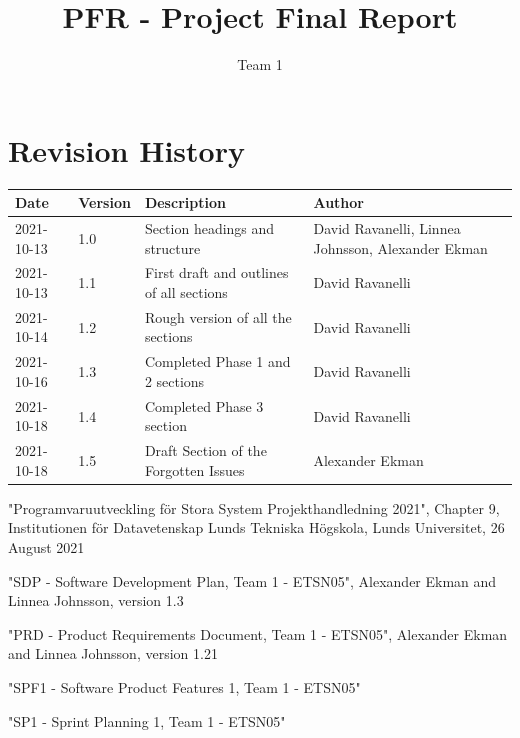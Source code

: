 \documentclass{article}
\title{PFR - Project Final Report}
\author{Team 1}
\begin{document}
\date{}
\maketitle
\thispagestyle{fancy}
\newpage

\section*{Revision History}
\begin{table}[h]
    \centering
    \begin{tabular}{|l|l|p{55mm}|p{35mm}|}
    \hline
    Date & Version & Description & Author \\ 
    \hline\hline 
    2021-10-13 & 1.0 & Section headings and structure & David Ravanelli, Linnea Johnsson, Alexander Ekman  \\
    \hline
    2021-10-13 & 1.1 & First draft and outlines of all sections & David Ravanelli  \\
    \hline
     2021-10-14 & 1.2 & Rough version of all the sections & David Ravanelli \\
    \hline
     2021-10-16 & 1.3 & Completed Phase 1 and 2 sections & David Ravanelli \\
    \hline
      2021-10-18 & 1.4 & Completed Phase 3 section & David Ravanelli \\
    \hline
    2021-10-18 & 1.5 & Draft Section of the Forgotten Issues & Alexander Ekman \\
    \hline
    \end{tabular}
    \label{tab:history}
\end{table}
\newpage

\begin{thebibliography}{widest entry}

     "Programvaruutveckling för Stora System Projekthandledning 2021", Chapter 9, Institutionen för Datavetenskap Lunds Tekniska Högskola, Lunds Universitet, 26 August 2021
    
     "SDP - Software Development Plan, Team 1 - ETSN05", Alexander Ekman and Linnea Johnsson, version 1.3
    
     "PRD - Product Requirements Document, Team 1 - ETSN05", Alexander Ekman and Linnea Johnsson, version 1.21
    
     "SPF1 - Software Product Features 1, Team 1 - ETSN05"
    
     "SP1 - Sprint Planning 1, Team 1 - ETSN05"
    
\end{thebibliography}
\newpage
\end{document}
